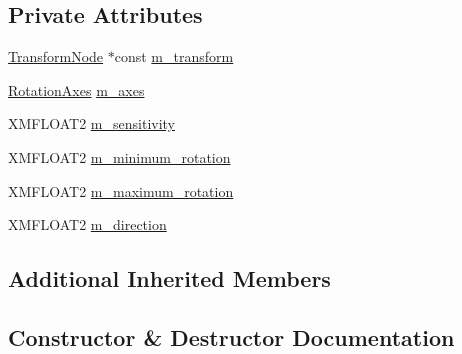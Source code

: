 \subsection*{Private Attributes}
\begin{DoxyCompactItemize}
\item 
\hyperlink{classmage_1_1_transform_node}{Transform\+Node} $\ast$const \hyperlink{classmage_1_1_mouse_look_script_a419b30350dc3eed30ae2f983812391f5}{m\+\_\+transform}
\item 
\hyperlink{namespacemage_a548e5c31b08a1078841ed21948f5bf4c}{Rotation\+Axes} \hyperlink{classmage_1_1_mouse_look_script_ab5df1b96d5860a9b8f30256e7c89b26b}{m\+\_\+axes}
\item 
X\+M\+F\+L\+O\+A\+T2 \hyperlink{classmage_1_1_mouse_look_script_a4f38b9bd8e7271503a70753ce6a923c7}{m\+\_\+sensitivity}
\item 
X\+M\+F\+L\+O\+A\+T2 \hyperlink{classmage_1_1_mouse_look_script_ad09bda241666f60dfc408500cafd073d}{m\+\_\+minimum\+\_\+rotation}
\item 
X\+M\+F\+L\+O\+A\+T2 \hyperlink{classmage_1_1_mouse_look_script_a0d5f2933555b76efd7cf83c7672574dd}{m\+\_\+maximum\+\_\+rotation}
\item 
X\+M\+F\+L\+O\+A\+T2 \hyperlink{classmage_1_1_mouse_look_script_a07c9a61869dab687a0426fa0c4b41fa7}{m\+\_\+direction}
\end{DoxyCompactItemize}
\subsection*{Additional Inherited Members}


\subsection{Constructor \& Destructor Documentation}
\hypertarget{classmage_1_1_mouse_look_script_a23956bd4bd9541f6ea06b4dd561efb40}{}\label{classmage_1_1_mouse_look_script_a23956bd4bd9541f6ea06b4dd561efb40} 
